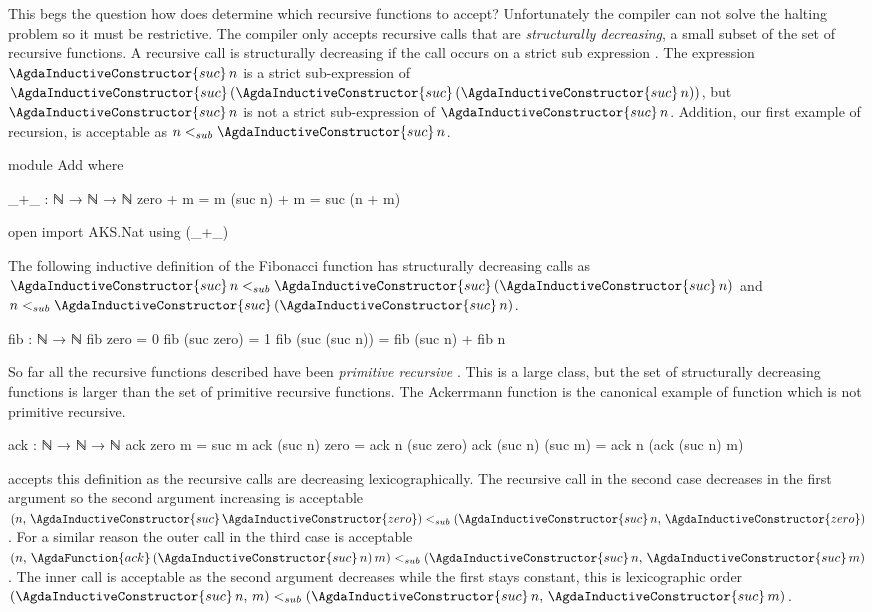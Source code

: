 \documentclass[./Thesis.tex]{subfiles}
\begin{document}
This begs the question how does \Agda{} determine which recursive functions to
accept? Unfortunately the \Agda{} compiler can not solve the halting problem so
it must be restrictive. The compiler only accepts recursive
calls that are \textit{structurally decreasing}, a small
subset of the set of recursive functions. A recursive call is structurally
decreasing if the call occurs on a strict sub expression \cite{agda}. The
expression $\AgdaInductiveConstructor{suc} \, n$ is a strict sub-expression of
$\AgdaInductiveConstructor{suc} \,
  (\AgdaInductiveConstructor{suc} \,
    (\AgdaInductiveConstructor{suc} \, n))
$,
but $\AgdaInductiveConstructor{suc} \, n$ is not a strict sub-expression of
$\AgdaInductiveConstructor{suc} \, n$.
Addition, our first example of recursion, is acceptable as
$n <_{sub} \AgdaInductiveConstructor{suc} \, n$.
\begin{code}[hide]
  module Add where
\end{code}
\begin{code}
    _+_ : ℕ → ℕ → ℕ
    zero + m = m
    (suc n) + m = suc (n + m)
\end{code}
\begin{code}[hide]
  open import AKS.Nat using (_+_)
\end{code}
The following inductive definition of the Fibonacci function
has structurally decreasing calls as
$\AgdaInductiveConstructor{suc} \, n <_{sub} \AgdaInductiveConstructor{suc} \, (\AgdaInductiveConstructor{suc} \, n)$
and
$n <_{sub} \AgdaInductiveConstructor{suc} \, (\AgdaInductiveConstructor{suc} \, n)$.
\begin{code}
  fib : ℕ → ℕ
  fib zero = 0
  fib (suc zero) = 1
  fib (suc (suc n)) = fib (suc n) + fib n
\end{code}
So far all the recursive functions described have been
\textit{primitive recursive} \cite{soare}. This is a large class, but the set of
structurally decreasing functions is larger than the set of primitive
recursive functions. The Ackerrmann function is the canonical example of
function which is not primitive recursive.
\begin{code}
  ack : ℕ → ℕ → ℕ
  ack zero m = suc m
  ack (suc n) zero = ack n (suc zero)
  ack (suc n) (suc m) = ack n (ack (suc n) m)
\end{code}
\Agda{} accepts this definition as the recursive
calls are decreasing lexicographically.
The recursive call in the second case decreases in the first argument so
the second argument increasing is acceptable
$
(n, \, \AgdaInductiveConstructor{suc} \, \AgdaInductiveConstructor{zero})
<_{sub}
(\AgdaInductiveConstructor{suc} \, n, \, \AgdaInductiveConstructor{zero})
$.
For a similar reason the outer call in the third case is acceptable
$
(n, \, \AgdaFunction{ack} \, (\AgdaInductiveConstructor{suc} \, n) \, m)
<_{sub}
(\AgdaInductiveConstructor{suc} \, n, \, \AgdaInductiveConstructor{suc} \, m)
$.
The inner call is acceptable as the second argument decreases while the first
stays constant, this is lexicographic order
$
(\AgdaInductiveConstructor{suc} \, n, \, m)
<_{sub}
(\AgdaInductiveConstructor{suc} \, n, \, \AgdaInductiveConstructor{suc} \, m)
$. \\
\end{document}
